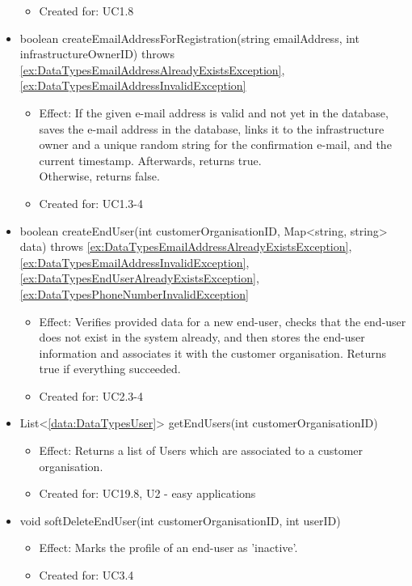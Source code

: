 \begin{description}
\begin{itemize}[noitemsep,nolistsep,leftmargin=-.25cm]
\begin{itemize}[noitemsep,nolistsep]
\item Created for: UC1.8
        \end{itemize}
      \item \textsf{boolean createEmailAddressForRegistration(string emailAddress, int infrastructureOwnerID) throws \ref{ex:DataTypesEmailAddressAlreadyExistsException}, \ref{ex:DataTypesEmailAddressInvalidException}}
        \begin{itemize}[noitemsep,nolistsep]
           \item Effect: If the given e-mail address is valid and not yet in the database, saves the e-mail address
in the database, links it to the infrastructure owner and a unique random string for the confirmation e-mail,
and the current timestamp. Afterwards, returns true. \\
Otherwise, returns false.
\item Created for: UC1.3-4
        \end{itemize}
      \item \textsf{boolean createEndUser(int customerOrganisationID, Map\textless{}string, string\textgreater{} data) throws \ref{ex:DataTypesEmailAddressAlreadyExistsException}, \ref{ex:DataTypesEmailAddressInvalidException}, \ref{ex:DataTypesEndUserAlreadyExistsException}, \ref{ex:DataTypesPhoneNumberInvalidException}}
        \begin{itemize}[noitemsep,nolistsep]
           \item Effect: Verifies provided data for a new end-user, checks that the end-user does not exist in the system already, and then stores the end-user information and associates it with the customer organisation. Returns true if everything succeeded.
\item Created for: UC2.3-4
        \end{itemize}
      \item \textsf{List\textless{}\ref{data:DataTypesUser}\textgreater{} getEndUsers(int customerOrganisationID)}
        \begin{itemize}[noitemsep,nolistsep]
           \item Effect: Returns a list of Users which are associated to a customer organisation.
\item Created for: UC19.8, U2 - easy applications
        \end{itemize}
      \item \textsf{void softDeleteEndUser(int customerOrganisationID, int userID)}
        \begin{itemize}[noitemsep,nolistsep]
           \item Effect: Marks the profile of an end-user as 'inactive'.
\item Created for: UC3.4
        \end{itemize}
    \end{itemize}
    \end{description}

